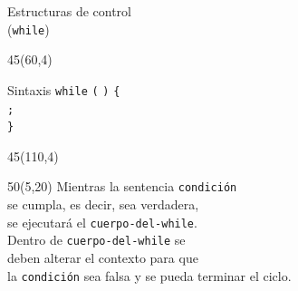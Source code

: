 \documentclass[aspectratio=169]{beamer}
\begin{document}
\begin{frame}[fragile,t]{Estructuras de control\\ (\texttt{while})}
    \begin{textblock}{45}(60,4)
    \begin{block}{\small Sintaxis}
    \vspace{0.2cm}
    \scriptsize
    {\large \texttt{while}} {\large \texttt{(}}
     {\large \texttt{)}} {\large \texttt{\{}}\\ \vspace{0.2cm}
    \hspace{0.7cm}  {\large \texttt{;}}\\ \vspace{0.2cm}
    \hspace{0.3cm} {\large \texttt{\}}}
    \end{block}
    \end{textblock}
    \begin{textblock}{45}(110,4)
    \end{textblock}
    \begin{textblock}{50}(5,20)
    \small
    Mientras la sentencia \texttt{condición}\\ se cumpla, es decir, sea verdadera,\\
    se ejecutará el \texttt{cuerpo-del-while}.\\
    \bigskip
    Dentro de \texttt{cuerpo-del-while} se\\ deben alterar el contexto para que\\ la \texttt{condición} sea falsa y se pueda terminar el ciclo.
    \end{textblock}

\end{frame}
\end{document}
